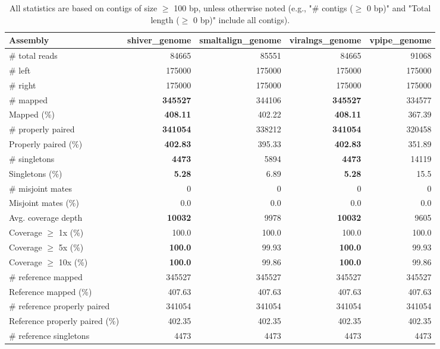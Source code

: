 \documentclass[12pt,a4paper]{article}
\begin{document}
\begin{table}[ht]
\begin{center}
\caption{All statistics are based on contigs of size $\geq$ 100 bp, unless otherwise noted (e.g., "\# contigs ($\geq$ 0 bp)" and "Total length ($\geq$ 0 bp)" include all contigs).}
\begin{tabular}{|l*{4}{|r}|}
\hline
Assembly & shiver\_genome & smaltalign\_genome & viralngs\_genome & vpipe\_genome \\ \hline
\# total reads & 84665 & 85551 & 84665 & 91068 \\ \hline
\# left & 175000 & 175000 & 175000 & 175000 \\ \hline
\# right & 175000 & 175000 & 175000 & 175000 \\ \hline
\# mapped & {\bf 345527} & 344106 & {\bf 345527} & 334577 \\ \hline
Mapped (\%) & {\bf 408.11} & 402.22 & {\bf 408.11} & 367.39 \\ \hline
\# properly paired & {\bf 341054} & 338212 & {\bf 341054} & 320458 \\ \hline
Properly paired (\%) & {\bf 402.83} & 395.33 & {\bf 402.83} & 351.89 \\ \hline
\# singletons & {\bf 4473} & 5894 & {\bf 4473} & 14119 \\ \hline
Singletons (\%) & {\bf 5.28} & 6.89 & {\bf 5.28} & 15.5 \\ \hline
\# misjoint mates & 0 & 0 & 0 & 0 \\ \hline
Misjoint mates (\%) & 0.0 & 0.0 & 0.0 & 0.0 \\ \hline
Avg. coverage depth & {\bf 10032} & 9978 & {\bf 10032} & 9605 \\ \hline
Coverage $\geq$ 1x (\%) & 100.0 & 100.0 & 100.0 & 100.0 \\ \hline
Coverage $\geq$ 5x (\%) & {\bf 100.0} & 99.93 & {\bf 100.0} & 99.93 \\ \hline
Coverage $\geq$ 10x (\%) & {\bf 100.0} & 99.86 & {\bf 100.0} & 99.86 \\ \hline
\# reference mapped & 345527 & 345527 & 345527 & 345527 \\ \hline
Reference mapped (\%) & 407.63 & 407.63 & 407.63 & 407.63 \\ \hline
\# reference properly paired & 341054 & 341054 & 341054 & 341054 \\ \hline
Reference properly paired (\%) & 402.35 & 402.35 & 402.35 & 402.35 \\ \hline
\# reference singletons & 4473 & 4473 & 4473 & 4473 \\ \hline

\end{tabular}
\end{center}
\end{table}
\end{document}
